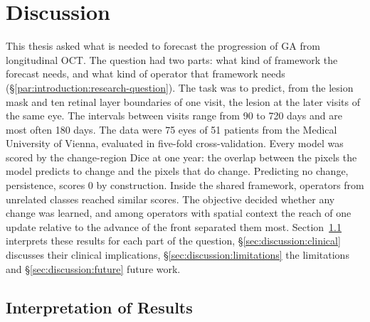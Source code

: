 \cleardoubleoddpage%
\chapter{Discussion}
\label{ch:discussion}




This thesis asked what is needed to forecast the progression of GA from
longitudinal OCT. The question had two parts: what kind of framework the
forecast needs, and what kind of operator that framework needs
(\S\ref{par:introduction:research-question}). The task was to predict,
from the lesion mask and ten retinal layer boundaries of one visit, the
lesion at the later visits of the same eye. The intervals between visits
range from 90 to 720 days and are most often 180 days. The data were 75
eyes of 51 patients from the Medical University of Vienna, evaluated in
five-fold cross-validation. Every model was scored by the change-region
Dice at one year: the overlap between the pixels the model predicts to
change and the pixels that do change. Predicting no change, persistence,
scores 0 by construction. Inside the shared framework, operators from
unrelated classes reached similar scores. The objective decided whether
any change was learned, and among operators with spatial context the reach
of one update relative to the advance of the front separated them most.
Section~\ref{sec:discussion:interpretation} interprets these results for
each part of the question, \S\ref{sec:discussion:clinical} discusses their
clinical implications, \S\ref{sec:discussion:limitations} the limitations
and \S\ref{sec:discussion:future} future work.


\section{Interpretation of Results}
\label{sec:discussion:interpretation}

